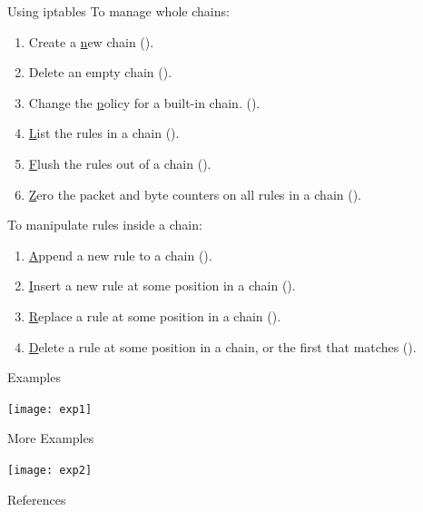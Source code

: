 \documentclass{wx672beamer}
\begin{document}
\begin{frame}{Using iptables}
  To manage whole chains:
  \begin{enumerate}
  \item Create a \underline{n}ew chain ().
  \item Delete an empty chain ().
  \item Change the \underline{p}olicy for a built-in chain. ().
  \item \underline{L}ist the rules in a chain ().
  \item \underline{F}lush the rules out of a chain ().
  \item \underline{Z}ero the packet and byte counters on all rules in a chain ().
  \end{enumerate}
  To manipulate rules inside a chain:
  \begin{enumerate}
  \item \underline{A}ppend a new rule to a chain ().
  \item \underline{I}nsert a new rule at some position in a chain ().
  \item \underline{R}eplace a rule at some position in a chain ().
  \item \underline{D}elete a rule at some position in a chain, or the first that matches
    ().
  \end{enumerate}
\end{frame}

\begin{frame}{Examples}
  \begin{block}{}
    \texttt{[image: exp1]}
  \end{block}
\end{frame}

\begin{frame}{More Examples}
  \begin{block}{}
    \texttt{[image: exp2]}
  \end{block}
\end{frame}

\begin{frame}[allowframebreaks=.8]{References}
  \begin{refsection}
    \nocite{rfc2663, rfc3022, rfc2827, rfc1858, rfc3128, wiki:iptables, bautts2005linux,
      hunt2002tcp}%
    \printbibliography[heading=none]
  \end{refsection}
\end{frame}
\end{document}
